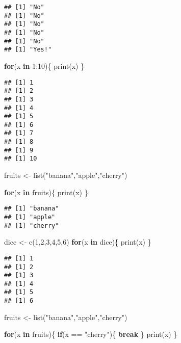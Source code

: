 \documentclass[
]{article}
\newenvironment{Shaded}{\begin{snugshade}}{\end{snugshade}}
\newcommand{\ControlFlowTok}[1]{\textcolor[rgb]{0.13,0.29,0.53}{\textbf{#1}}}
\newcommand{\DecValTok}[1]{\textcolor[rgb]{0.00,0.00,0.81}{#1}}
\newcommand{\FunctionTok}[1]{\textcolor[rgb]{0.00,0.00,0.00}{#1}}
\newcommand{\NormalTok}[1]{#1}
\newcommand{\OtherTok}[1]{\textcolor[rgb]{0.56,0.35,0.01}{#1}}
\newcommand{\SpecialCharTok}[1]{\textcolor[rgb]{0.00,0.00,0.00}{#1}}
\newcommand{\StringTok}[1]{\textcolor[rgb]{0.31,0.60,0.02}{#1}}
\begin{document}
\begin{verbatim}
## [1] "No"
## [1] "No"
## [1] "No"
## [1] "No"
## [1] "No"
## [1] "Yes!"
\end{verbatim}

\begin{Shaded}
\begin{Highlighting}[]
\ControlFlowTok{for}\NormalTok{(x }\ControlFlowTok{in} \DecValTok{1}\SpecialCharTok{:}\DecValTok{10}\NormalTok{)\{}
  \FunctionTok{print}\NormalTok{(x)}
\NormalTok{\}}
\end{Highlighting}
\end{Shaded}

\begin{verbatim}
## [1] 1
## [1] 2
## [1] 3
## [1] 4
## [1] 5
## [1] 6
## [1] 7
## [1] 8
## [1] 9
## [1] 10
\end{verbatim}

\begin{Shaded}
\begin{Highlighting}[]
\NormalTok{fruits }\OtherTok{\textless{}{-}} \FunctionTok{list}\NormalTok{(}\StringTok{"banana"}\NormalTok{,}\StringTok{"apple"}\NormalTok{,}\StringTok{"cherry"}\NormalTok{)}

\ControlFlowTok{for}\NormalTok{(x }\ControlFlowTok{in}\NormalTok{ fruits)\{}
  \FunctionTok{print}\NormalTok{(x)}
\NormalTok{\}}
\end{Highlighting}
\end{Shaded}

\begin{verbatim}
## [1] "banana"
## [1] "apple"
## [1] "cherry"
\end{verbatim}

\begin{Shaded}
\begin{Highlighting}[]
\NormalTok{dice }\OtherTok{\textless{}{-}} \FunctionTok{c}\NormalTok{(}\DecValTok{1}\NormalTok{,}\DecValTok{2}\NormalTok{,}\DecValTok{3}\NormalTok{,}\DecValTok{4}\NormalTok{,}\DecValTok{5}\NormalTok{,}\DecValTok{6}\NormalTok{)}
\ControlFlowTok{for}\NormalTok{(x }\ControlFlowTok{in}\NormalTok{ dice)\{}
  \FunctionTok{print}\NormalTok{(x)}
\NormalTok{\}}
\end{Highlighting}
\end{Shaded}

\begin{verbatim}
## [1] 1
## [1] 2
## [1] 3
## [1] 4
## [1] 5
## [1] 6
\end{verbatim}

\begin{Shaded}
\begin{Highlighting}[]
\NormalTok{fruits }\OtherTok{\textless{}{-}} \FunctionTok{list}\NormalTok{(}\StringTok{"banana"}\NormalTok{,}\StringTok{"apple"}\NormalTok{,}\StringTok{"cherry"}\NormalTok{)}

\ControlFlowTok{for}\NormalTok{(x }\ControlFlowTok{in}\NormalTok{ fruits)\{}
  \ControlFlowTok{if}\NormalTok{(x }\SpecialCharTok{==} \StringTok{"cherry"}\NormalTok{)\{}
    \ControlFlowTok{break}
\NormalTok{  \}}
  \FunctionTok{print}\NormalTok{(x)}
\NormalTok{\}}
\end{Highlighting}
\end{Shaded}
\end{document}
